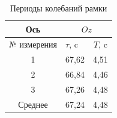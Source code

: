 \documentclass[a4paper, 12pt]{article}
\begin{document}
        \begin{table}
            \centering
            \caption{Периоды колебаний рамки}
            \begin{tabular}{|c|cc|}
                \hline
                Ось & \multicolumn{2}{c|}{$Oz$} \\
                \hline
                № измерения & \multicolumn{1}{l|}{$\tau$, c} & $T$, c \\
                \hline
                1 & \multicolumn{1}{c|}{67,62} & 4,51 \\
                \hline
                2 & \multicolumn{1}{c|}{66,84} & 4,46 \\
                \hline
                3 & \multicolumn{1}{c|}{67,26} & 4,48 \\
                \hline
                Среднее & \multicolumn{1}{c|}{67,24} & 4,48 \\
                \hline
            \end{tabular}
        \end{table}
\end{document}
